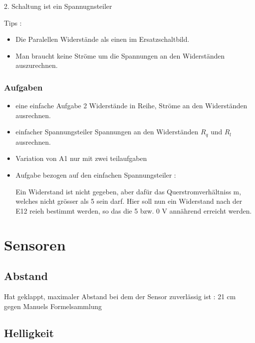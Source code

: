 \documentclass{article}
\begin{document}
2. Schaltung ist ein Spannugnsteiler

Tips :

\begin{itemize}


\item Die Paralellen Widerst\"{a}nde als einen im Ersatzschaltbild.

\item Man braucht keine Str\"{o}me um die Spannungen an den Widerst\"{a}nden auszurechnen.

\end{itemize}

\subsubsection{Aufgaben}

\begin{itemize}

\item eine einfache Aufgabe 2 Widerst\"{a}nde in Reihe, Str\"{o}me an den Widerst\"{a}nden ausrechnen.

\item einfacher Spannungsteiler Spannungen an den Widerst\"{a}nden $R_q$ und $R_l$ ausrechnen.

\item Variation von A1 nur mit zwei teilaufgaben

\item Aufgabe bezogen auf den einfachen Spannungsteiler : 

Ein Widerstand ist nicht gegeben, aber daf\"{u}r das Querstromverh\"{a}ltniss m, welches nicht gr\"{o}sser als 5 sein darf. Hier soll nun ein Widerstand nach der E12 reieh bestimmt werden, so das die 5 bzw. 0 V ann\"{a}hrend erreicht werden. 

\end{itemize}

\section{Sensoren}

\subsection{Abstand}

Hat geklappt, maximaler Abstand bei dem der Sensor zuverl\"{a}ssig ist : 21 cm gegen Manuels Formelsammlung

\subsection{Helligkeit}
\end{document}
